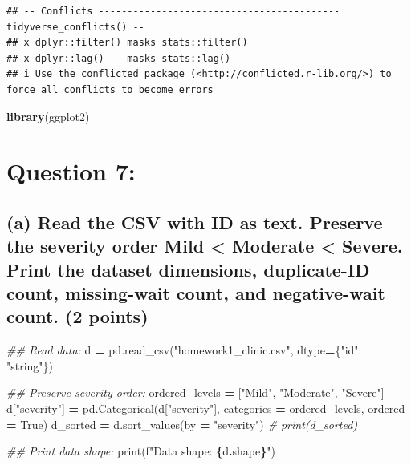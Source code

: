 \documentclass[
]{article}
\newenvironment{Shaded}{\begin{snugshade}}{\end{snugshade}}
\newcommand{\BuiltInTok}[1]{#1}
\newcommand{\CommentTok}[1]{\textcolor[rgb]{0.56,0.35,0.01}{\textit{#1}}}
\newcommand{\FunctionTok}[1]{\textcolor[rgb]{0.13,0.29,0.53}{\textbf{#1}}}
\newcommand{\NormalTok}[1]{#1}
\newcommand{\OperatorTok}[1]{\textcolor[rgb]{0.81,0.36,0.00}{\textbf{#1}}}
\newcommand{\SpecialCharTok}[1]{\textcolor[rgb]{0.81,0.36,0.00}{\textbf{#1}}}
\newcommand{\SpecialStringTok}[1]{\textcolor[rgb]{0.31,0.60,0.02}{#1}}
\newcommand{\StringTok}[1]{\textcolor[rgb]{0.31,0.60,0.02}{#1}}
\newcommand{\VariableTok}[1]{\textcolor[rgb]{0.00,0.00,0.00}{#1}}
\begin{document}
\begin{verbatim}
## -- Conflicts ------------------------------------------ tidyverse_conflicts() --
## x dplyr::filter() masks stats::filter()
## x dplyr::lag()    masks stats::lag()
## i Use the conflicted package (<http://conflicted.r-lib.org/>) to force all conflicts to become errors
\end{verbatim}

\begin{Shaded}
\begin{Highlighting}[]
\FunctionTok{library}\NormalTok{(ggplot2)}
\end{Highlighting}
\end{Shaded}

\section{Question 7:}\label{question-7}

\subsection{(a) Read the CSV with ID as text. Preserve the severity
order Mild \textless{} Moderate \textless{} Severe. Print the dataset
dimensions, duplicate-ID count, missing-wait count, and negative-wait
count. (2
points)}\label{a-read-the-csv-with-id-as-text.-preserve-the-severity-order-mild-moderate-severe.-print-the-dataset-dimensions-duplicate-id-count-missing-wait-count-and-negative-wait-count.-2-points}

\begin{Shaded}
\begin{Highlighting}[]
\CommentTok{\#\# Read data:}
\NormalTok{d }\OperatorTok{=}\NormalTok{ pd.read\_csv(}\StringTok{"homework1\_clinic.csv"}\NormalTok{, dtype}\OperatorTok{=}\NormalTok{\{}\StringTok{"id"}\NormalTok{: }\StringTok{"string"}\NormalTok{\}) }

\CommentTok{\#\# Preserve severity order:}
\NormalTok{ordered\_levels }\OperatorTok{=}\NormalTok{ [}\StringTok{"Mild"}\NormalTok{, }\StringTok{"Moderate"}\NormalTok{, }\StringTok{"Severe"}\NormalTok{]}
\NormalTok{d[}\StringTok{"severity"}\NormalTok{] }\OperatorTok{=}\NormalTok{ pd.Categorical(d[}\StringTok{"severity"}\NormalTok{], categories }\OperatorTok{=}\NormalTok{ ordered\_levels, ordered }\OperatorTok{=} \VariableTok{True}\NormalTok{)}
\NormalTok{d\_sorted }\OperatorTok{=}\NormalTok{ d.sort\_values(by }\OperatorTok{=} \StringTok{"severity"}\NormalTok{)}
\CommentTok{\# print(d\_sorted)}

\CommentTok{\#\# Print data shape:}
\BuiltInTok{print}\NormalTok{(}\SpecialStringTok{f"Data shape: }\SpecialCharTok{\{}\NormalTok{d}\SpecialCharTok{.}\NormalTok{shape}\SpecialCharTok{\}}\SpecialStringTok{"}\NormalTok{)}
\end{Highlighting}
\end{Shaded}
\end{document}

